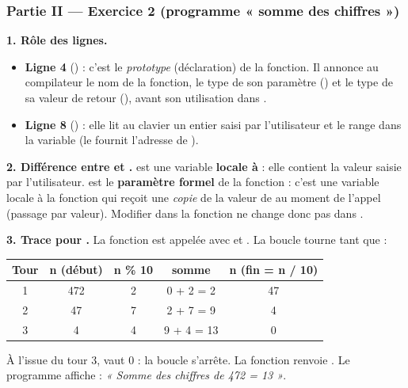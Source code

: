 \subsubsection*{Partie II — Exercice 2 (programme « somme des chiffres »)}

\textbf{1. Rôle des lignes.}
\begin{itemize}
\item \textbf{Ligne 4} () : c'est le
\emph{prototype} (déclaration) de la fonction. Il annonce au compilateur le nom
de la fonction, le type de son paramètre () et le type de sa valeur de
retour (), avant son utilisation dans .
\item \textbf{Ligne 8} () : elle lit au clavier un
entier saisi par l'utilisateur et le range dans la variable  (le
\code{\&} fournit l'adresse de ).
\end{itemize}

\medskip
\textbf{2. Différence entre  et .}  est une variable
\textbf{locale à } : elle contient la valeur saisie par l'utilisateur.
 est le \textbf{paramètre formel} de la fonction  :
c'est une variable locale à la fonction qui reçoit une \emph{copie} de la valeur
de  au moment de l'appel (passage par valeur). Modifier  dans la
fonction ne change donc pas  dans .

\medskip
\textbf{3. Trace pour .} La fonction est appelée avec 
et . La boucle  tourne tant que  :

\begin{center}\small
\begin{tabular}{@{}ccccc@{}}
\toprule
\textbf{Tour} & \textbf{n (début)} & \textbf{n \% 10} & \textbf{somme} & \textbf{n (fin = n / 10)}\\
\midrule
1 & 472 & 2 & 0 + 2 = 2  & 47\\
2 & 47  & 7 & 2 + 7 = 9  & 4\\
3 & 4   & 4 & 9 + 4 = 13 & 0\\
\bottomrule
\end{tabular}
\end{center}

\noindent À l'issue du tour 3,  vaut 0 : la boucle s'arrête. La fonction
renvoie . Le programme affiche :
\emph{« Somme des chiffres de 472 = 13 »}.

